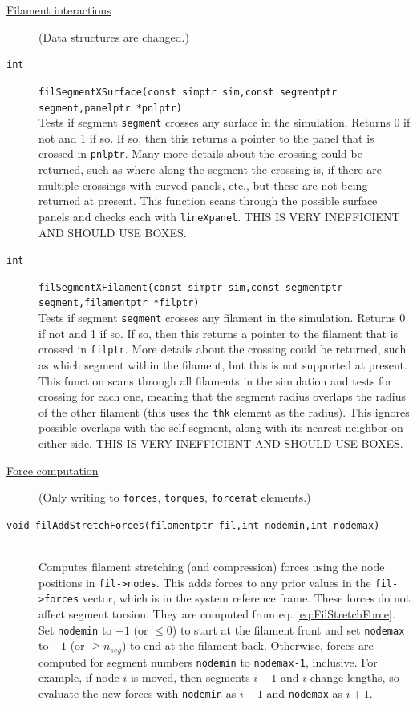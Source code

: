 \documentclass {scrbook}
\newcommand {\ttt} {\texttt}
\begin{document}
\begin{description}
\item[\underline{Filament interactions}]
(Data structures are changed.)

\item[\ttt{int}]
\ttt{filSegmentXSurface(const simptr sim,const segmentptr segment,panelptr *pnlptr)}
\hfill \\
Tests if segment \ttt{segment} crosses any surface in the simulation. Returns 0 if not and 1 if so. If so, then this returns a pointer to the panel that is crossed in \ttt{pnlptr}. Many more details about the crossing could be returned, such as where along the segment the crossing is, if there are multiple crossings with curved panels, etc., but these are not being returned at present. This function scans through the possible surface panels and checks each with \ttt{lineXpanel}. THIS IS VERY INEFFICIENT AND SHOULD USE BOXES.

\item[\ttt{int}]
\ttt{filSegmentXFilament(const simptr sim,const segmentptr segment,filamentptr *filptr)}
\hfill \\
Tests if segment \ttt{segment} crosses any filament in the simulation. Returns 0 if not and 1 if so. If so, then this returns a pointer to the filament that is crossed in \ttt{filptr}. More details about the crossing could be returned, such as which segment within the filament, but this is not supported at present. This function scans through all filaments in the simulation and tests for crossing for each one, meaning that the segment radius overlaps the radius of the other filament (this uses the \ttt{thk} element as the radius). This ignores possible overlaps with the self-segment, along with its nearest neighbor on either side. THIS IS VERY INEFFICIENT AND SHOULD USE BOXES.

\item[\underline{Force computation}]
(Only writing to \ttt{forces}, \ttt{torques}, \ttt{forcemat} elements.)

\item[\ttt{void filAddStretchForces(filamentptr fil,int nodemin,int nodemax)}]
\hfill \\
Computes filament stretching (and compression) forces using the node positions in \ttt{fil->nodes}. This adds forces to any prior values in the \ttt{fil->forces} vector, which is in the system reference frame. These forces do not affect segment torsion. They are computed from eq. \ref{eq:FilStretchForce}. Set \ttt{nodemin} to $-1$ (or $\leq 0$) to start at the filament front and set \ttt{nodemax} to $-1$ (or $\geq n_{seg}$) to end at the filament back. Otherwise, forces are computed for segment numbers \ttt{nodemin} to \ttt{nodemax-1}, inclusive. For example, if node $i$ is moved, then segments $i-1$ and $i$ change lengths, so evaluate the new forces with \ttt{nodemin} as $i-1$ and \ttt{nodemax} as $i+1$.


\end{description}
\end{document}
